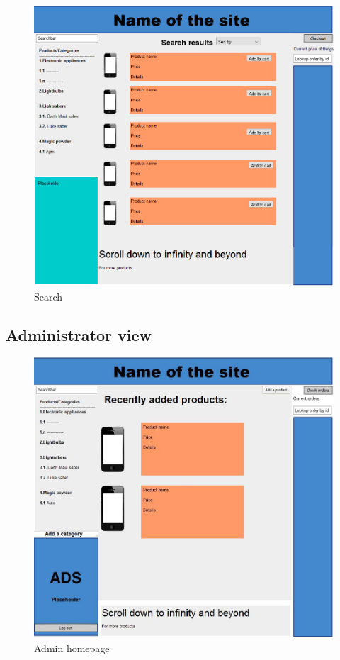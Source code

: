 \documentclass[a4paper,12pt]{article}
\begin{document}
\begin{figure}[htbp]
	\caption{Search}
	\includegraphics[width=\textwidth,height=\textheight,keepaspectratio]{img/Search.png}
\end{figure}

\newpage
\subsection{Administrator view}

\begin{figure}[htbp]
	\caption{Admin homepage}
	\includegraphics[width=\textwidth,height=\textheight,keepaspectratio]{img/Admin_Homepage.png}
\end{figure}
\end{document}
